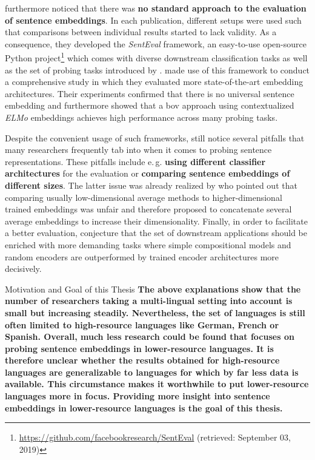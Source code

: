 \citep{Conneau.2018b} furthermore noticed that there was \textbf{no standard approach to the evaluation of sentence embeddings}. In each publication, different setups were used such that comparisons between individual results started to lack validity. As a consequence, they developed the \textit{SentEval} framework, an easy-to-use open-source Python project\footnote{\url{https://github.com/facebookresearch/SentEval} (retrieved: September 03, 2019)} which comes with diverse downstream classification tasks as well as the set of probing tasks introduced by \citep{Conneau.2018a}. \citep{Perone.2018} made use of this framework to conduct a comprehensive study in which they evaluated more state-of-the-art embedding architectures. Their experiments confirmed that there is no universal sentence embedding and furthermore showed that a \gls{bov} approach using contextualized \textit{ELMo} embeddings achieves high performance across many probing tasks.

Despite the convenient usage of such frameworks, \citep{Eger.2019} still notice several pitfalls that many researchers frequently tab into when it comes to probing sentence representations. These pitfalls include e.\,g. \textbf{using different classifier architectures} for the evaluation or \textbf{comparing sentence embeddings of different sizes}. The latter issue was already realized by \citep{Rueckle.2018} who pointed out that comparing usually low-dimensional average methods to higher-dimensional trained embeddings was unfair and therefore proposed to concatenate several average embeddings to increase their dimensionality. Finally, in order to facilitate a better evaluation, \citep{Eger.2019} conjecture that the set of downstream applications should be enriched with more demanding tasks where simple compositional models and random encoders are outperformed by trained encoder architectures more decisively.

\begin{tudbox}{Motivation and Goal of this Thesis}
\textbf{The above explanations show that the number of researchers taking a multi-lingual setting into account is small but increasing steadily. Nevertheless, the set of languages is still often limited to high-resource languages like German, French or Spanish. Overall, much less research could be found that focuses on probing sentence embeddings in lower-resource languages. It is therefore unclear whether the results obtained for high-resource languages are generalizable to languages for which by far less data is available. This circumstance makes it worthwhile to put lower-resource languages more in focus. Providing more insight into sentence embeddings in lower-resource languages is the goal of this thesis.}
\end{tudbox}

